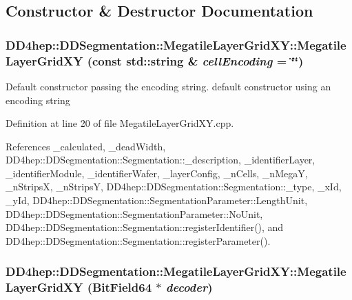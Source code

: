 \subsection{Constructor \& Destructor Documentation}
\hypertarget{class_d_d4hep_1_1_d_d_segmentation_1_1_megatile_layer_grid_x_y_a9795d16d3a1423824a95e6b753dc90e8}{
\subsubsection[{MegatileLayerGridXY}]{\setlength{\rightskip}{0pt plus 5cm}DD4hep::DDSegmentation::MegatileLayerGridXY::MegatileLayerGridXY (const std::string \& {\em cellEncoding} = {\ttfamily \char`\"{}\char`\"{}})}}
\label{class_d_d4hep_1_1_d_d_segmentation_1_1_megatile_layer_grid_x_y_a9795d16d3a1423824a95e6b753dc90e8}


Default constructor passing the encoding string. default constructor using an encoding string 

Definition at line 20 of file MegatileLayerGridXY.cpp.

References \_\-calculated, \_\-deadWidth, DD4hep::DDSegmentation::Segmentation::\_\-description, \_\-identifierLayer, \_\-identifierModule, \_\-identifierWafer, \_\-layerConfig, \_\-nCells, \_\-nMegaY, \_\-nStripsX, \_\-nStripsY, DD4hep::DDSegmentation::Segmentation::\_\-type, \_\-xId, \_\-yId, DD4hep::DDSegmentation::SegmentationParameter::LengthUnit, DD4hep::DDSegmentation::SegmentationParameter::NoUnit, DD4hep::DDSegmentation::Segmentation::registerIdentifier(), and DD4hep::DDSegmentation::Segmentation::registerParameter().\hypertarget{class_d_d4hep_1_1_d_d_segmentation_1_1_megatile_layer_grid_x_y_ad60883ac07ec3cec93063cab4d79a76d}{
\subsubsection[{MegatileLayerGridXY}]{\setlength{\rightskip}{0pt plus 5cm}DD4hep::DDSegmentation::MegatileLayerGridXY::MegatileLayerGridXY ({\bf BitField64} $\ast$ {\em decoder})}}
\label{class_d_d4hep_1_1_d_d_segmentation_1_1_megatile_layer_grid_x_y_ad60883ac07ec3cec93063cab4d79a76d}


